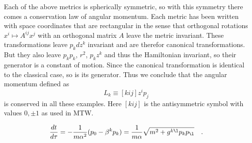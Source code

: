     Each of the above metrics is spherically symmetric, so with this
symmetry there comes a conservation law of angular momentum.
    Each metric has been written with space coordinates that are
rectangular in the sense that orthogonal rotations $x^i \mapsto A^{ij}
x^j$ with an orthogonal matrix $A$ leave the metric invariant.
    These transformations leave  $p_k dz^k$ invariant and are therefor
canonical transformations.  
    But they also leave $p_k p_k$, $r^2$, $p_k z^k$ and thus the
Hamiltonian invariant, so their generator is a constant of motion.
    Since the canonical transformation is identical to the classical
case, so is its generator.
    Thus we conclude that the angular momentum defined as
    \begin{equation}\label{eq-L}
    L_k \equiv [kij] z^i p_j
    \end{equation}
is conserved in all these examples.
    Here $[kij]$ is the antisymmetric symbol with values $0,\pm 1$ as
used in MTW.




    
    \begin{equation}\label{eq-tau}
             \frac{dt}{d\tau} 
            = -\frac{1}{m\alpha^2} (p_0 - \beta^k p_k)
            = \frac{1}{m\alpha}\sqrt{m^2 + g^{k\l} p_k p_\l}
            \quad .
    \end{equation}



 

